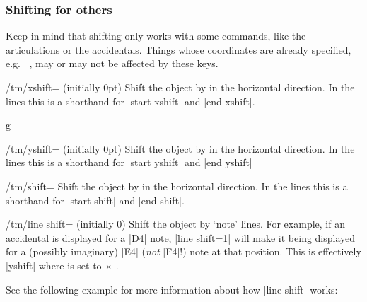 \subsubsection{Shifting for others}\label{sec:custom:transformations:others}
Keep in mind that shifting only works with some commands, like the articulations 
or the accidentals. Things whose coordinates are already specified, e.g. 
|\tmwhole|, may or may not be affected by these keys.
\begin{key}{/tm/xshift= (initially 0pt)}
  Shift the object by  in the horizontal direction. In the lines 
  this is a shorthand for |start xshift| and |end xshift|.
\end{key}
\begin{codeexample}[]
\begin{tmline}
\begin{tmstaff}{g}{}
\end{tmstaff}
\end{tmline}
\end{codeexample}
\begin{key}{/tm/yshift= (initially 0pt)}
  Shift the object by  in the horizontal direction. In the lines 
  this is a shorthand for |start yshift| and |end yshift|
\end{key}
\begin{key}{/tm/shift=}
  Shift the object by  in the horizontal direction. In the lines 
  this is a shorthand for |start shift| and |end shift|.
\end{key}
\begin{key}{/tm/line shift= (initially 0)}
  Shift the object by  `note' lines. For example, if an accidental 
  is displayed for a |D4| note, |line shift=1| will make it being displayed for 
  a (possibly imaginary) |E4| (\emph{not} |F4|!) note at that position. This is 
  effectively |yshift| where  is set to  $\times$ 
  .
\end{key}
See the following example for more information about how |line shift| works:
\begin{codeexample}[]
\begin{tmline}
\begin{tmstaff*}{}
   
\end{tmstaff*}
\end{tmline}
\end{codeexample}
